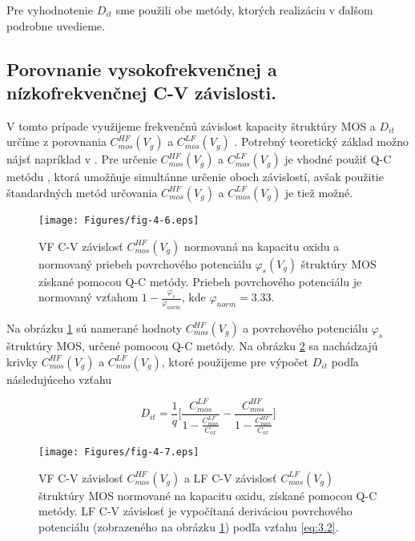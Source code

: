 Pre vyhodnotenie $D_{it}$ sme použili obe metódy, ktorých realizáciu v
ďalšom podrobne uvedieme.

\subsection{Porovnanie vysokofrekvenčnej a nízkofrekvenčnej C-V závislosti.}\label{sec:4.2.1}
V tomto prípade využijeme frekvenčnú závislost kapacity štruktúry MOS
a $D_{it}$ určíme z porovnania $C_{mos}^{HF}(V_{g})$ a
$C_{mos}^{LF}(V_{g})$ . Potrebný teoretický základ možno nájsť
napríklad v \cite{I.1}.  Pre určenie $C_{mos}^{HF}(V_{g})$ a
$C_{mos}^{LF}(V_{g})$ je vhodné použiť Q-C metódu \cite{3.4, 3.6, 3.7,
 3.8}, ktorá umožňuje simultánne určenie oboch závislostí, avšak
použitie štandardných metód určovania $C_{mos}^{HF}(V_{g})$ a
$C_{mos}^{LF}(V_{g})$ je tiež možné.

\begin{figure}[h!]\centering
\texttt{[image: Figures/fig-4-6.eps]}
\captionsetup{justification=raggedright, singlelinecheck=false}
\caption[VF C-V závislosť $C_{mos}^{HF}(V_{g})$ a priebeh povrchového
  potenciálu $\varphi_{s}(V_{g})$ štruktúry MOS získané pomocou Q-C
  metódy]{VF C-V závislosť $C_{mos}^{HF}(V_{g})$ normovaná na kapacitu
  oxidu a normovaný priebeh povrchového potenciálu
  $\varphi_{s}(V_{g})$ štruktúry MOS získané pomocou Q-C metódy.
  Priebeh povrchového potenciálu je normovaný vzťahom
  $1-\frac{\varphi_{s}}{\varphi_{norm}}$, kde $\varphi_{norm}=3.33$.}
\label{fig:4.6}
\end{figure}

Na obrázku \ref{fig:4.6} sú namerané hodnoty $C_{mos}^{HF}(V_{g})$ a
povrchového potenciálu $\varphi_{s}$ štruktúry MOS, určené pomocou Q-C
metódy. Na obrázku \ref{fig:4.7} sa nachádzajú krivky
$C_{mos}^{HF}(V_{g})$ a $C_{mos}^{LF}(V_{g})$, ktoré použijeme pre
výpočet $D_{it}$ podľa následujúceho vzťahu \cite{4.15}

\begin{equation}\label{eq:4.15}
D_{it} = \frac{1}{q} \Bigg[\frac{C_{mos}^{LF}}{1-\frac{C_{mos}^{LF}}{C_{ox}}} - \frac{C_{mos}^{HF}}{1-\frac{C_{mos}^{HF}}{C_{ox}}}\Bigg]
\end{equation}

\begin{figure}[h!]\centering
\texttt{[image: Figures/fig-4-7.eps]}
\captionsetup{justification=raggedright, singlelinecheck=false}
\caption[VF C-V závislosť $C_{mos}^{HF}(V_{g})$ a LF C-V závislosť
  $C_{mos}^{LF}(V_{g})$ štruktúry MOS normované na kapacitu oxidu,
  získané pomocou Q-C metódy]{VF C-V závislosť $C_{mos}^{HF}(V_{g})$ a
  LF C-V závislosť $C_{mos}^{LF}(V_{g})$ štruktúry MOS normované na
  kapacitu oxidu, získané pomocou Q-C metódy.  LF C-V závislosť je
  vypočítaná deriváciou povrchového potenciálu (zobrazeného na obrázku
  \ref{fig:4.6}) podľa vzťahu \ref{eq:3.2}.}
\label{fig:4.7}
\end{figure}

